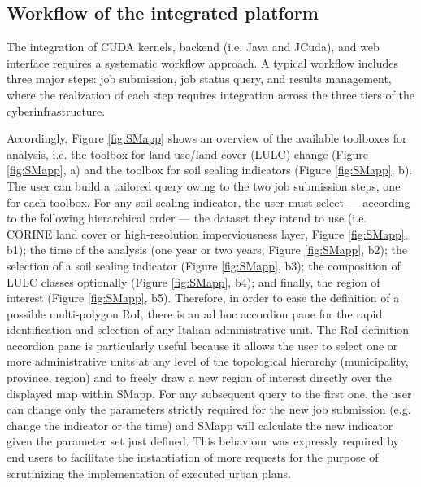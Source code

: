 \documentclass[APA,LATO1COL,doublespace]{WileyNJD-v2}
\begin{document}
\subsection{Workflow of the integrated platform}
The integration of CUDA kernels, backend (i.e. Java and JCuda), and web interface requires a systematic workflow approach. 
A typical workflow includes three major steps: job submission, job status query, and results management, where the realization of each step requires integration across the three tiers of the cyberinfrastructure. 

Accordingly, Figure \ref{fig:SMapp} shows an overview of the available toolboxes for analysis, i.e. the toolbox for land use/land cover (LULC) change (Figure \ref{fig:SMapp}, a) and the toolbox for soil sealing indicators (Figure \ref{fig:SMapp}, b).
The user can build a tailored query owing to the two job submission steps, one for each toolbox. 
For any soil sealing indicator, the user must select --- according to the following hierarchical order --- the dataset they intend to use (i.e. CORINE land cover or high-resolution imperviousness layer, Figure \ref{fig:SMapp}, b1); the time of the analysis (one year or two years, Figure \ref{fig:SMapp}, b2); the selection of a soil sealing indicator (Figure \ref{fig:SMapp}, b3); the composition of LULC classes optionally (Figure \ref{fig:SMapp}, b4); and finally, the region of interest (Figure \ref{fig:SMapp}, b5). Therefore, in order to ease the definition of a possible multi-polygon RoI, there is an ad hoc accordion pane for the rapid identification and selection of any Italian administrative unit.
The RoI definition accordion pane is particularly useful because it allows the user to select one or more administrative units at any level of the topological hierarchy (municipality, province, region) and to freely draw a new region of interest directly over the displayed map within SMapp.
For any subsequent query to the first one, the user can change only the parameters strictly required for the new job submission (e.g. change the indicator or the time) and SMapp will calculate the new indicator given the parameter set just defined. 
This behaviour was expressly required by end users to facilitate the instantiation of more requests for the purpose of scrutinizing the implementation of executed urban plans.
\end{document}
